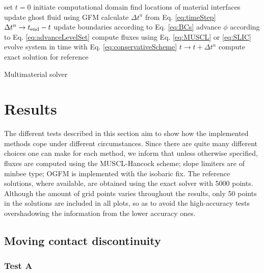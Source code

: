 \documentclass[final,3p,twocolumn]{elsarticle}
\begin{document}
\begin{algorithm}[htb]
    set $t=0$\; 
    initiate computational domain\;
    {
        find locations of material interfaces\;
        {
            update ghost fluid using GFM\;
        }
        calculate $\Delta t^n$ from Eq. \eqref{eq:timeStep}\;
        {
            $\Delta t^n \rightarrow t_{\rm end} - t$ \;
        }
        update boundaries according to Eq. \eqref{eq:BCs}\;
        advance $\phi$ according to Eq. \eqref{eq:advanceLevelSet}\;
        {
            compute fluxes using Eq. \eqref{eq:MUSCL} or \eqref{eq:SLIC}\;
            evolve system in time with Eq.
            \eqref{eq:conservativeScheme}\;
        }
        $t \rightarrow t + \Delta t^n$\;
    }
    {
        compute exact solution for reference\;
    }
    \caption{Multimaterial solver}
    \label{alg:complete}
\end{algorithm}

\section{Results}
\label{sec:results}

The different tests described in this section aim to show how the implemented
methods cope under different circumstances. Since there are quite many
different choices one can make for each method, we inform that unless otherwise
specified, fluxes are computed using the MUSCL-Hancock scheme; slope limiters
are of minbee type; OGFM is implemented with the isobaric fix. The reference
solutions, where available, are obtained using the exact solver with 5000
points. Although the amount of grid points varies throughout the results, only
50 points in the solutions are included in all plots, so as to avoid the
high-accuracy tests overshadowing the information from the lower accuracy ones.

\subsection{Moving contact discontinuity}
\label{subsec:moving}

\subsubsection{Test A}
\end{document}
